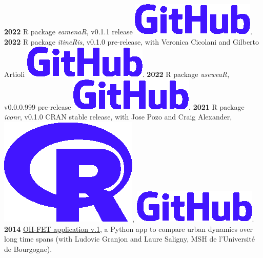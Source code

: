 \documentclass{article}
\begin{document}
\textbf{2022 }\textsf{R} package \textit{eamenaR}, v0.1.1 release \href{https://github.com/eamena-project/eamenaR/tree/main#readme}{\includegraphics[scale=0.12]{github-rect.png}}.
\smallbreak
\textbf{2022 }\textsf{R} package \textit{itineRis}, v0.1.0 pre-release, with Veronica Cicolani and Gilberto Artioli \href{https://github.com/zoometh/itineRis/tree/main#readme}{\includegraphics[scale=0.12]{github-rect.png}}.
\textbf{2022 }\textsf{R} package \textit{useweaR}, v0.0.0.999 pre-release \href{https://github.com/zoometh/itineRis/tree/main#readme}{\includegraphics[scale=0.12]{github-rect.png}}.
\smallbreak
\textbf{2021 }\textsf{R} package \textit{iconr}, v0.1.0 CRAN stable release, with Jose Pozo and Craig Alexander, \href{https://cran.r-project.org/web/packages/iconr/index.html}{\includegraphics[scale=0.04]{prog-r.png}}, \href{https://github.com/zoometh/iconr#readme}{\includegraphics[scale=0.12]{github-rect.png}}.
\smallbreak
\textbf{2014 }\href{https://www.oxbowbooks.com/dbbc/caa2014-21st-century-archaeology.html/}{OH-FET application v.1}, a \textsf{Python} app to compare urban dynamics over long time spans (with Ludovic Granjon and Laure Saligny, MSH de l'Universit\'{e} de Bourgogne).
\end{document}
